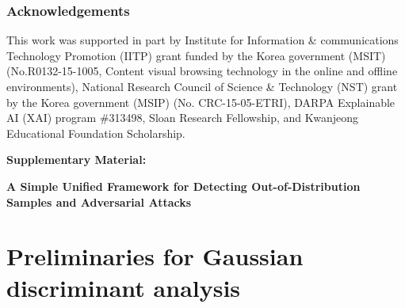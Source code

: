 \documentclass{article}
\begin{document}
\subsubsection*{Acknowledgements} 
This work was supported in part by Institute for Information \& communications Technology Promotion (IITP) grant funded by the Korea government (MSIT) (No.R0132-15-1005, Content visual browsing technology in the online and offline environments), National Research Council of Science \& Technology (NST) grant by the Korea government (MSIP) (No. CRC-15-05-ETRI), DARPA Explainable AI (XAI) program \#313498, Sloan Research Fellowship, and Kwanjeong Educational Foundation Scholarship.




\appendix


\onecolumn
\clearpage
\begin{center}{\bf {\LARGE Supplementary Material:}}
\end{center}
\begin{center}{\bf {\Large A Simple Unified Framework for Detecting Out-of-Distribution Samples and Adversarial Attacks}}
\end{center}

\section{Preliminaries for Gaussian discriminant analysis} \label{sec:preliminaries}
\end{document}
